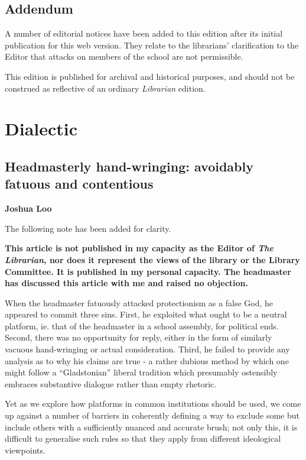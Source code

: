 \documentclass[12pt,a4paper]{report}
\begin{document}
\begin{multicols}{2}
\section{Addendum}

\begin{multicols}{2}
A number of editorial notices have been added to this edition after its initial publication for this web version. They relate to the librarians' clarification to the Editor that attacks on members of the school are not permissible. 

This edition is published for archival and historical purposes, and should not be construed as reflective of an ordinary \textit{Librarian} edition. 
\end{multicols}

\chapter{Dialectic}

\section{Headmasterly hand-wringing: avoidably fatuous and contentious}

\textbf{Joshua Loo}

\begin{multicols}{2}

The following note has been added for clarity.

\textbf{This article is not published in my capacity as the Editor of \textit{The Librarian}, nor does it represent the views of the library or the Library Committee. It is published in my personal capacity. The headmaster has discussed this article with me and raised no objection.
}

When the headmaster fatuously attacked protectionism as a false God, he
appeared to commit three sins. First, he exploited what ought to be a
neutral platform, ie. that of the headmaster in a school assembly, for
political ends. Second, there was no opportunity for reply, either in
the form of similarly vacuous hand-wringing or actual consideration.
Third, he failed to provide any analysis as to why his claims are true -
a rather dubious method by which one might follow a ``Gladstonian''
liberal tradition which presumably ostensibly embraces substantive
dialogue rather than empty rhetoric.

Yet as we explore how platforms in common institutions should be used,
we come up against a number of barriers in coherently defining a way to
exclude some but include others with a sufficiently nuanced and accurate
brush; not only this, it is difficult to generalise such rules so that
they apply from different ideological viewpoints.


\end{multicols}
\end{multicols}
\end{document}
